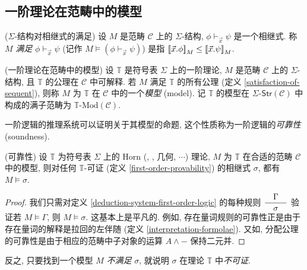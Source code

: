 \subsection{一阶理论在范畴中的模型}

\begin{definition}
	[label={satisfaction-of-sequent}]
	{($\Sigma$-结构对相继式的满足)}
	设 $M$ 是范畴 $\mathcal C$ 上的 $\Sigma$-结构, $\phi\vdash_{\vec x}\psi$ 是一个相继式.
	称 $M$ \emph{满足} $\phi\vdash_{\vec x}\psi$ (记作 $M\models(\phi\vdash_{\vec x}\psi)$) 是指 ${[\![\vec x.\phi]\!]}_M \leq {[\![\vec x.\psi]\!]}_M$.
\end{definition}

\begin{definition}
	[label={model-first-order-theory-in-category}]
	{(一阶理论在范畴中的模型)}
	设 $\mathbb T$ 是符号表 $\Sigma$ 上的一阶理论, $M$ 是范畴 $\mathcal C$ 上的 $\Sigma$-结构,
	且 $\mathbb T$ 的公理在 $\mathcal C$ 中可解释.
	若 $M$ 满足 $\mathbb T$ 的所有公理 (定义 \ref{satisfaction-of-sequent}), 则称 $M$ 为 $\mathbb T$ 在 $\mathcal C$ 中的一个\emph{模型} (model).
	记 $\mathbb T$ 的模型在 $\Sigma\text{-}\mathsf{Str}(\mathcal C)$ 中构成的满子范畴为 $\mathbb T\text{-Mod}(\mathcal C)$.
\end{definition}

一阶逻辑的推理系统可以证明关于其模型的命题, 这个性质称为一阶逻辑的\emph{可靠性} (soundness).

\begin{prop}
	[label={soundness-first-order-logic}]
	{(可靠性)}
	设 $\mathbb T$ 为符号表 $\Sigma$ 上的 Horn (\regular{}, \coherent{}, 几何, $\cdots$) 理论, $M$ 为 $\mathbb T$ 在合适的范畴 $\mathcal C$ 中的模型, 则对任何 $\mathbb T$-可证 (定义 \ref{first-order-provability}) 的相继式 $\sigma$, 都有 $M\models\sigma$.
\end{prop}
\begin{proof}
	我们只需对定义 \ref{deduction-system-first-order-logic} 的每种规则 $\displaystyle\dfrac{\quad \Gamma \quad}{\quad \sigma \quad}$ 验证若 $M\models\Gamma$, 则 $M\models\sigma$. 这基本上是平凡的. 例如, 存在量词规则的可靠性正是由于存在量词的解释是拉回的左伴随 (定义 \ref{interpretation-formolae}). 又如, 分配公理的可靠性是由于相应的范畴中子对象的运算 $A\land {-}$ 保持二元并.
\end{proof}

\begin{remark}
	{}
	反之, 只要找到一个模型 $M$ \emph{不满足} $\sigma$, 就说明 $\sigma$ 在理论 $\mathbb T$ 中\emph{不可证}.
\end{remark}

